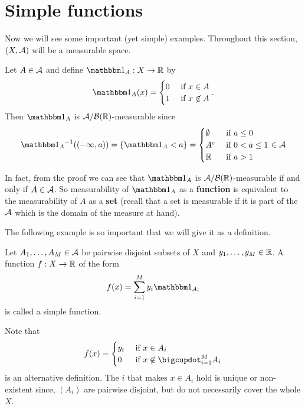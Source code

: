 \section{Simple functions}

Now we will see some important (yet simple) examples. Throughout this section, $(X, \mathcal{A})$ will be a measurable space.

\begin{eg}
	Let $A \in \mathcal{A}$ and define $\ind_A : X \to \R$ by
	\begin{align*}
		\ind_A(x) = \begin{cases}
		0 \tif x \in A\\
		1 \tif x \not\in A
		\end{cases}.
	\end{align*}
	Then $\ind_A$ is $\mathcal{A}/\mathcal{B}(\mathbb{R})$-measurable since
	\begin{align*}
		\inv{\ind_A}((-\infty, a)) = \{\ind_A < a\} = \begin{cases}
		\emptyset \tif a \leq 0\\
		A^\complement \tif 0 < a \leq 1\\
		\R \tif a > 1
		\end{cases} \in \sa
	\end{align*}
	
	In fact, from the proof we can see that $\ind_A$ is $\mathcal{A}/\mathcal{B}(\mathbb{R})$-measurable if and only if $A \in \mathcal{A}$. So measurability of $\ind_A$ as a \textbf{function} is equivalent to the measurability of $A$ as a \textbf{set} (recall that a set is measurable if it is part of the $\mathcal{A}$ which is the domain of the measure at hand).
\end{eg}

The following example is so important that we will give it as a definition.

\begin{dfn}
	Let $A_1, \dots, A_M \in \mathcal{A}$ be pairwise disjoint subsets of $X$ and $y_1, \dots, y_M \in\mathbb{R}$. A function $f: X \to \mathbb{R}$ of the form
	\begin{align*}
		f(x) = \sum_{i = 1}^M y_i \ind_{A_i}
	\end{align*}
	is called a simple function.
\end{dfn}

Note that
\begin{align*}
	f(x) = \begin{cases}
	y_i \tif x \in A_i \\
	0 \tif x \not\in \bigcupdot_{i = 1}^M A_i
	\end{cases}
\end{align*}
is an alternative definition. The $i$ that makes $x \in A_i$ hold is unique or non-existent since, $(A_i)$ are pairwise disjoint, but do not necessarily cover the whole $X$.

